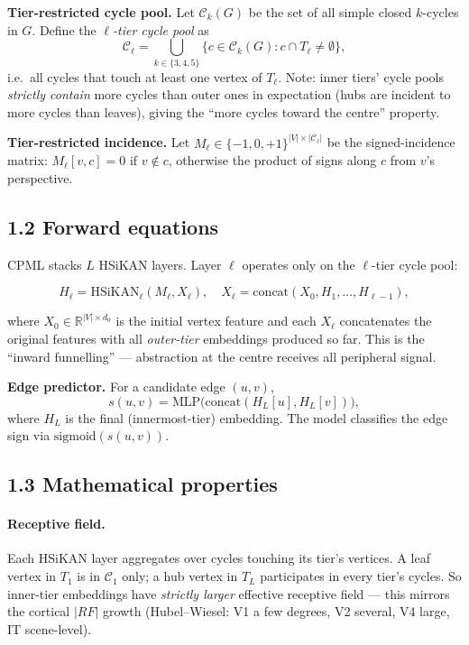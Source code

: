 \documentclass[10pt]{article}
\begin{document}
\textbf{Tier-restricted cycle pool.} Let $\mathcal{C}_k(G)$ be the
set of all simple closed $k$-cycles in $G$. Define the
\emph{$\ell$-tier cycle pool} as
\[
  \mathcal{C}_\ell = \bigcup_{k \in \{3, 4, 5\}}
                      \{c \in \mathcal{C}_k(G) :
                       c \cap T_\ell \ne \emptyset\},
\]
i.e.\ all cycles that touch at least one vertex of $T_\ell$. Note:
inner tiers' cycle pools \emph{strictly contain} more cycles than
outer ones in expectation (hubs are incident to more cycles than
leaves), giving the ``more cycles toward the centre'' property.

\textbf{Tier-restricted incidence.} Let
$M_\ell \in \{-1, 0, +1\}^{|V| \times |\mathcal{C}_\ell|}$ be the
signed-incidence matrix: $M_\ell[v, c] = 0$ if $v \notin c$,
otherwise the product of signs along $c$ from $v$'s perspective.

\subsection*{1.2 Forward equations}

CPML stacks $L$ HSiKAN layers. Layer $\ell$ operates only on the
$\ell$-tier cycle pool:

\[
  H_\ell = \mathrm{HSiKAN}_\ell(M_\ell, X_\ell), \quad
  X_\ell = \mathrm{concat}(X_0, H_1, \ldots, H_{\ell-1}),
\]

where $X_0 \in \mathbb{R}^{|V| \times d_0}$ is the initial vertex
feature and each $X_\ell$ concatenates the original features with all
\emph{outer-tier} embeddings produced so far. This is the
``inward funnelling'' --- abstraction at the centre receives all
peripheral signal.

\textbf{Edge predictor.} For a candidate edge $(u, v)$,
\[
  s(u, v) = \mathrm{MLP}\big( \mathrm{concat}(H_L[u], H_L[v]) \big),
\]
where $H_L$ is the final (innermost-tier) embedding. The model
classifies the edge sign via $\mathrm{sigmoid}(s(u, v))$.

\subsection*{1.3 Mathematical properties}

\paragraph{Receptive field.} Each HSiKAN layer aggregates over cycles
touching its tier's vertices. A leaf vertex in $T_1$ is in
$\mathcal{C}_1$ only; a hub vertex in $T_L$ participates in every
tier's cycles. So inner-tier embeddings have \emph{strictly larger}
effective receptive field --- this mirrors the cortical
$|RF|$ growth (Hubel--Wiesel: V1 a few degrees, V2 several, V4 large,
IT scene-level).
\end{document}

